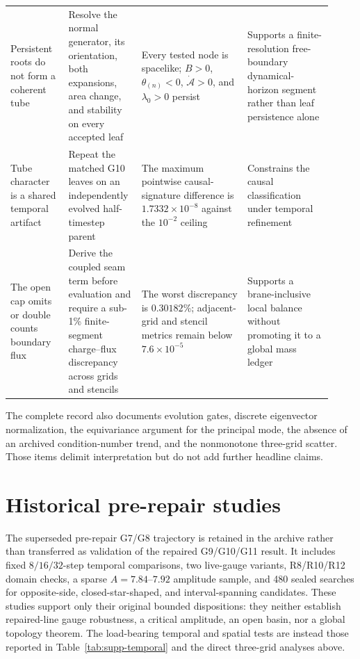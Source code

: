 \documentclass[11pt]{article}
\begin{document}
\begin{longtable}{@{}L{0.17\linewidth}L{0.19\linewidth}L{0.31\linewidth}L{0.25\linewidth}@{}}
Persistent roots do not form a coherent tube & Resolve the normal generator, its orientation, both expansions, area change, and stability on every accepted leaf & Every tested node is spacelike; $B>0$, $\theta_{(n)}<0$, $\dot{\mathcal A}>0$, and $\lambda_0>0$ persist & Supports a finite-resolution free-boundary dynamical-horizon segment rather than leaf persistence alone \\
Tube character is a shared temporal artifact & Repeat the matched G10 leaves on an independently evolved half-timestep parent & The maximum pointwise causal-signature difference is $1.7332\times10^{-8}$ against the $10^{-2}$ ceiling & Constrains the causal classification under temporal refinement \\
The open cap omits or double counts boundary flux & Derive the coupled seam term before evaluation and require a sub-1\% finite-segment charge--flux discrepancy across grids and stencils & The worst discrepancy is $0.30182\%$; adjacent-grid and stencil metrics remain below $7.6\times10^{-5}$ & Supports a brane-inclusive local balance without promoting it to a global mass ledger \\
\bottomrule
\end{longtable}
\normalsize

The complete record also documents evolution gates, discrete eigenvector
normalization, the equivariance argument for the principal mode, the absence
of an archived condition-number trend, and the nonmonotone three-grid scatter.
Those items delimit interpretation but do not add further headline claims.

\section{Historical pre-repair studies}

The superseded pre-repair G7/G8 trajectory is retained in the archive rather
than transferred as validation of the repaired G9/G10/G11 result.  It includes
fixed $8/16/32$-step temporal comparisons, two live-gauge variants, R8/R10/R12
domain checks, a sparse $A=7.84$--$7.92$ amplitude sample, and 480 sealed
searches for opposite-side, closed-star-shaped, and interval-spanning
candidates.  These studies support only their original bounded dispositions:
they neither establish repaired-line gauge robustness, a critical amplitude,
an open basin, nor a global topology theorem.  The load-bearing temporal and
spatial tests are instead those reported in Table~\ref{tab:supp-temporal} and
the direct three-grid analyses above.
\end{document}
